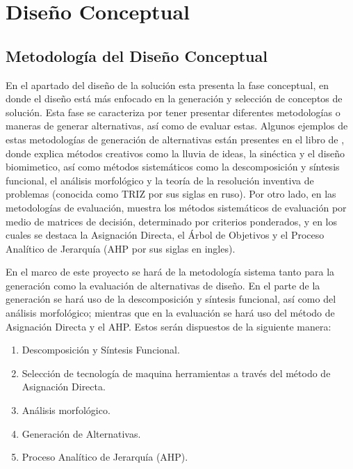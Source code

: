 \chapter{Diseño Conceptual}

\section{Metodología del Diseño Conceptual}
En el apartado del diseño de la solución esta presenta la fase conceptual, en donde el diseño está más enfocado en la generación y selección de conceptos de solución. Esta fase se caracteriza por tener presentar diferentes metodologías o maneras de generar alternativas, así como de evaluar estas. Algunos ejemplos de estas metodologías de generación de alternativas están presentes en el libro de \cite{dieter2012engineering}, donde explica métodos creativos como la lluvia de ideas, la sinéctica y el diseño biomimetico, así como métodos sistemáticos como la descomposición y síntesis funcional, el análisis morfológico y la teoría de la resolución inventiva de problemas (conocida como TRIZ por sus siglas en ruso). Por otro lado, en las metodologías de evaluación, \cite{dieter2012engineering} muestra los métodos sistemáticos de evaluación por medio de matrices de decisión, determinado por criterios ponderados, y en los cuales se destaca la Asignación Directa, el Árbol de Objetivos y el Proceso Analítico de Jerarquía (AHP por sus siglas en ingles).

En el marco de este proyecto se hará de la metodología sistema tanto para la generación como la evaluación de alternativas de diseño. En el parte de la generación se hará uso de la descomposición y síntesis funcional, así como del análisis morfológico; mientras que en la evaluación se hará uso del método de Asignación Directa y el AHP. Estos serán dispuestos de la siguiente manera:

\begin{enumerate} \nosep
    \item Descomposición y Síntesis Funcional.
    \item Selección de tecnología de maquina herramientas a través del método de Asignación Directa.
    \item Análisis morfológico.
    \item Generación de Alternativas.
    \item Proceso Analítico de Jerarquía  (AHP).
\end{enumerate}

